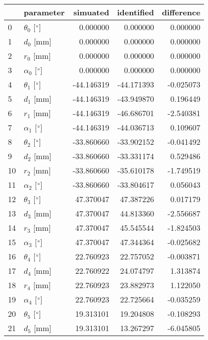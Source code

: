 \documentclass{standalone}%
\begin{document}
%
\normalsize%
\begin{tabular}{llrrr}
\toprule
{} &                 parameter &   simuated & identified & difference \\
\midrule
0  &  $\theta_{0}$ [$\degree$] &   0.000000 &   0.000000 &   0.000000 \\
1  &              $d_{0}$ [mm] &   0.000000 &   0.000000 &   0.000000 \\
2  &              $r_{0}$ [mm] &   0.000000 &   0.000000 &   0.000000 \\
3  &  $\alpha_{0}$ [$\degree$] &   0.000000 &   0.000000 &   0.000000 \\
4  &  $\theta_{1}$ [$\degree$] & -44.146319 & -44.171393 &  -0.025073 \\
5  &              $d_{1}$ [mm] & -44.146319 & -43.949870 &   0.196449 \\
6  &              $r_{1}$ [mm] & -44.146319 & -46.686701 &  -2.540381 \\
7  &  $\alpha_{1}$ [$\degree$] & -44.146319 & -44.036713 &   0.109607 \\
8  &  $\theta_{2}$ [$\degree$] & -33.860660 & -33.902152 &  -0.041492 \\
9  &              $d_{2}$ [mm] & -33.860660 & -33.331174 &   0.529486 \\
10 &              $r_{2}$ [mm] & -33.860660 & -35.610178 &  -1.749519 \\
11 &  $\alpha_{2}$ [$\degree$] & -33.860660 & -33.804617 &   0.056043 \\
12 &  $\theta_{3}$ [$\degree$] &  47.370047 &  47.387226 &   0.017179 \\
13 &              $d_{3}$ [mm] &  47.370047 &  44.813360 &  -2.556687 \\
14 &              $r_{3}$ [mm] &  47.370047 &  45.545544 &  -1.824503 \\
15 &  $\alpha_{3}$ [$\degree$] &  47.370047 &  47.344364 &  -0.025682 \\
16 &  $\theta_{4}$ [$\degree$] &  22.760923 &  22.757052 &  -0.003871 \\
17 &              $d_{4}$ [mm] &  22.760922 &  24.074797 &   1.313874 \\
18 &              $r_{4}$ [mm] &  22.760923 &  23.882973 &   1.122050 \\
19 &  $\alpha_{4}$ [$\degree$] &  22.760923 &  22.725664 &  -0.035259 \\
20 &  $\theta_{5}$ [$\degree$] &  19.313101 &  19.204808 &  -0.108293 \\
21 &              $d_{5}$ [mm] &  19.313101 &  13.267297 &  -6.045805 \\

\end{tabular}
\end{document}
